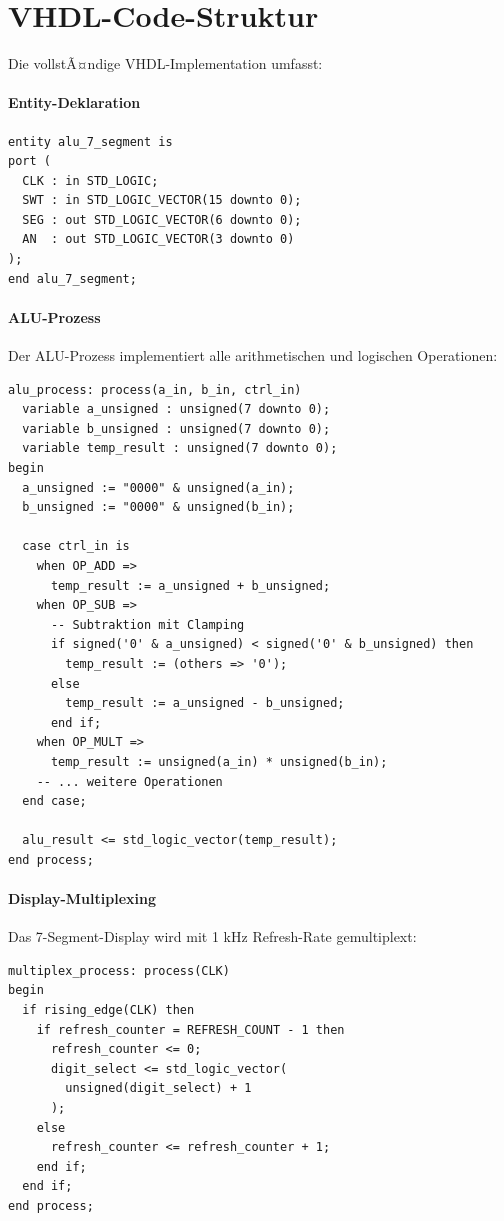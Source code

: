 ﻿\documentclass[12pt,a4paper]{report}
\begin{document}
\section{VHDL-Code-Struktur}

Die vollstÃ¤ndige VHDL-Implementation umfasst:

\paragraph{Entity-Deklaration}
\begin{lstlisting}[style=hdlstyle, caption={VHDL Entity}]
entity alu_7_segment is
port (
  CLK : in STD_LOGIC;
  SWT : in STD_LOGIC_VECTOR(15 downto 0);
  SEG : out STD_LOGIC_VECTOR(6 downto 0);
  AN  : out STD_LOGIC_VECTOR(3 downto 0)
);
end alu_7_segment;
\end{lstlisting}

\paragraph{ALU-Prozess}
Der ALU-Prozess implementiert alle arithmetischen und logischen Operationen:

\begin{lstlisting}[style=hdlstyle, caption={ALU-Operationen in VHDL}]
alu_process: process(a_in, b_in, ctrl_in)
  variable a_unsigned : unsigned(7 downto 0);
  variable b_unsigned : unsigned(7 downto 0);
  variable temp_result : unsigned(7 downto 0);
begin
  a_unsigned := "0000" & unsigned(a_in);
  b_unsigned := "0000" & unsigned(b_in);
  
  case ctrl_in is
    when OP_ADD =>
      temp_result := a_unsigned + b_unsigned;
    when OP_SUB =>
      -- Subtraktion mit Clamping
      if signed('0' & a_unsigned) < signed('0' & b_unsigned) then
        temp_result := (others => '0');
      else
        temp_result := a_unsigned - b_unsigned;
      end if;
    when OP_MULT =>
      temp_result := unsigned(a_in) * unsigned(b_in);
    -- ... weitere Operationen
  end case;
  
  alu_result <= std_logic_vector(temp_result);
end process;
\end{lstlisting}

\paragraph{Display-Multiplexing}
Das 7-Segment-Display wird mit 1 kHz Refresh-Rate gemultiplext:

\begin{lstlisting}[style=hdlstyle, caption={Display-Multiplexing}]
multiplex_process: process(CLK)
begin
  if rising_edge(CLK) then
    if refresh_counter = REFRESH_COUNT - 1 then
      refresh_counter <= 0;
      digit_select <= std_logic_vector(
        unsigned(digit_select) + 1
      );
    else
      refresh_counter <= refresh_counter + 1;
    end if;
  end if;
end process;
\end{lstlisting}
\end{document}
